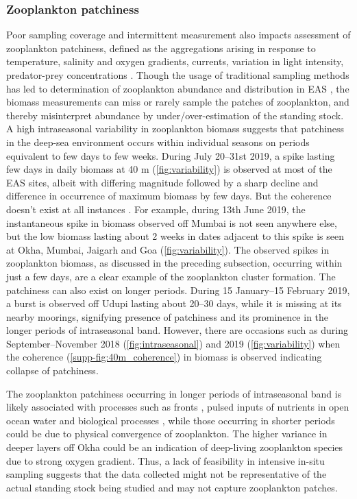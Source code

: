 \documentclass{article}
\begin{document}
    \subsubsection{Zooplankton patchiness}
    \label{sec:zooplanktonpatch}
    Poor sampling coverage and intermittent measurement also impacts assessment of zooplankton patchiness, defined as the aggregations arising in response to temperature, salinity and oxygen gradients, currents, variation in light intensity, predator-prey concentrations \citep{folt1999biological,raghukumar2003marine}. Though the usage of traditional sampling methods has led to determination of zooplankton abundance and distribution in EAS \citep{madhupratap1992zooplankton,madhupratap1996lack,khandagale2022seasonal}, the biomass measurements can miss or rarely sample the patches of zooplankton, and thereby misinterpret abundance by under/over-estimation of the standing stock. A high intraseasonal variability in zooplankton biomass suggests that patchiness in the deep-sea environment occurs within individual seasons on periods equivalent to few days to few weeks. During July 20--31st 2019, a spike lasting few days in daily biomass at 40 m (\cref{fig:variability}) is observed at most of the EAS sites, albeit with differing magnitude followed by a sharp decline and difference in occurrence of maximum biomass by few days. But the coherence doesn't exist at all instances . For example, during 13th June 2019, the instantaneous spike in biomass observed off Mumbai is not seen anywhere else, but the low biomass lasting about 2 weeks in dates adjacent to this spike is seen at  Okha, Mumbai, Jaigarh and Goa (\cref{fig:variability}). The observed spikes in zooplankton biomass, as discussed in the preceding subsection, occurring within just a few days, are a clear example of the zooplankton cluster formation. The patchiness can also exist on longer periods. During 15 January--15 February 2019, a burst is observed off Udupi lasting about 20--30 days, while it is missing at its nearby moorings, signifying presence of patchiness and its prominence in the longer periods of intraseasonal band. However, there are occasions such as during September--November 2018 (\cref{fig:intraseasonal}) and 2019 (\cref{fig:variability}) when the coherence (\cref{supp-fig:40m_coherence}) in biomass is observed indicating collapse of patchiness.
    
    The zooplankton patchiness occurring in longer periods of intraseasonal band is likely associated with processes such as fronts \citep{coyle2000seasonal,wade2001acoustic,hitchcock2002zooplankton}, pulsed inputs of nutrients in open ocean water \citep{anil2021short} and biological processes \citep{folt1999biological}, while those occurring in shorter periods could be due to physical convergence \citep{napp1996plankton} of zooplankton. The higher variance in deeper layers off Okha could be an indication of deep-living zooplankton species \citep{raghukumar2003marine} due to strong oxygen gradient. Thus, a lack of feasibility in intensive in-situ sampling suggests that the data collected might not be representative of the actual standing stock being studied \citep{smith1998seasonal} and may not capture zooplankton patches.
    
\end{document}

